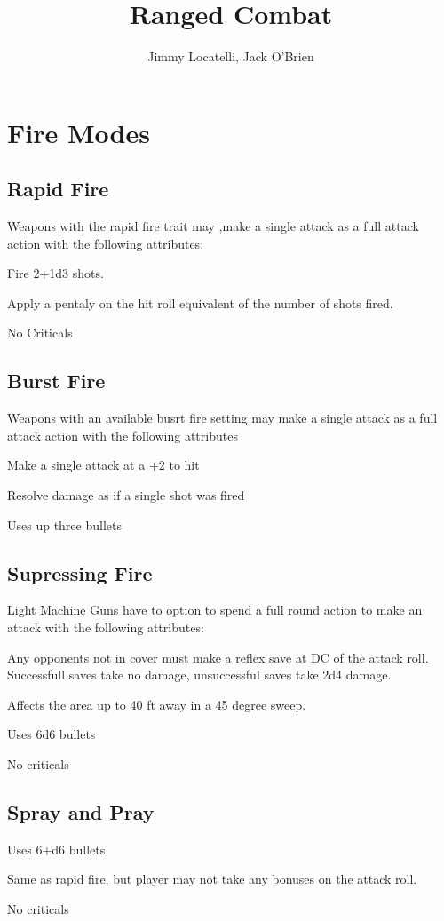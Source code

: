 \documentclass[12pt]{article}
\begin{document}
\title{Ranged Combat}
\author{Jimmy Locatelli, Jack O'Brien}
\maketitle

\section{Fire Modes}

\subsection{Rapid Fire}

Weapons with the rapid fire trait may ,make a single attack as a full attack action with the following attributes:

Fire 2+1d3 shots.

Apply a pentaly on the hit roll equivalent of the number of shots fired.

No Criticals

\subsection{Burst Fire}

Weapons with an available busrt fire setting may make a single attack as a full attack action with the following attributes

Make a single attack at a +2 to hit

Resolve damage as if a single shot was fired

Uses up three bullets

\subsection{Supressing Fire}

Light Machine Guns have to option to spend a full round action to make an attack with the following attributes:

Any opponents not in cover must make a reflex save at DC of the attack roll.  Successfull saves take no damage, unsuccessful saves take 2d4 damage.

Affects the area up to 40 ft away in a 45 degree sweep.

Uses 6d6 bullets

No criticals

\subsection{Spray and Pray}

Uses 6+d6 bullets

Same as rapid fire, but player may not take any bonuses on the attack roll.

No criticals
\end{document}
